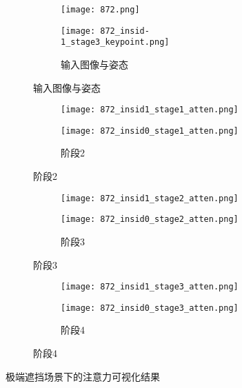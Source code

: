 \begin{figure}[H]
	\centering
	\begin{subfigure}[t]{0.22\textwidth}
		\centering
		\begin{subfigure}[t]{\linewidth}
			\texttt{[image: 872.png]}
		\end{subfigure}
		\vskip2pt
		\begin{subfigure}[t]{\linewidth}
			\texttt{[image: 872\_insid-1\_stage3\_keypoint.png]}
			\caption{输入图像与姿态}
		\end{subfigure}
	\end{subfigure}
	\begin{subfigure}[t]{0.22\textwidth}
		\centering
		\begin{subfigure}[t]{\linewidth}
			\texttt{[image: 872\_insid1\_stage1\_atten.png]}
		\end{subfigure}
		\vskip2pt
		\begin{subfigure}[t]{\linewidth}
			\texttt{[image: 872\_insid0\_stage1\_atten.png]}
			\caption{阶段2}
		\end{subfigure}
	\end{subfigure}
	\begin{subfigure}[t]{0.22\textwidth}
		\centering
		\begin{subfigure}[t]{\linewidth}
			\texttt{[image: 872\_insid1\_stage2\_atten.png]}
		\end{subfigure}
		\vskip2pt
		\begin{subfigure}[t]{\linewidth}
			\texttt{[image: 872\_insid0\_stage2\_atten.png]}
			\caption{阶段3}
		\end{subfigure}
	\end{subfigure}
	\begin{subfigure}[t]{0.22\textwidth}
		\centering
		\begin{subfigure}[t]{\linewidth}
			\texttt{[image: 872\_insid1\_stage3\_atten.png]}
		\end{subfigure}
		\vskip2pt
		\begin{subfigure}[t]{\linewidth}
			\texttt{[image: 872\_insid0\_stage3\_atten.png]}
			\caption{阶段4}
		\end{subfigure}
	\end{subfigure}
	\begin{minipage}{0.05\linewidth}
		
		\vskip2cm
	\end{minipage}
	\caption{极端遮挡场景下的注意力可视化结果}
	\label{fig:failcase}
\end{figure}


